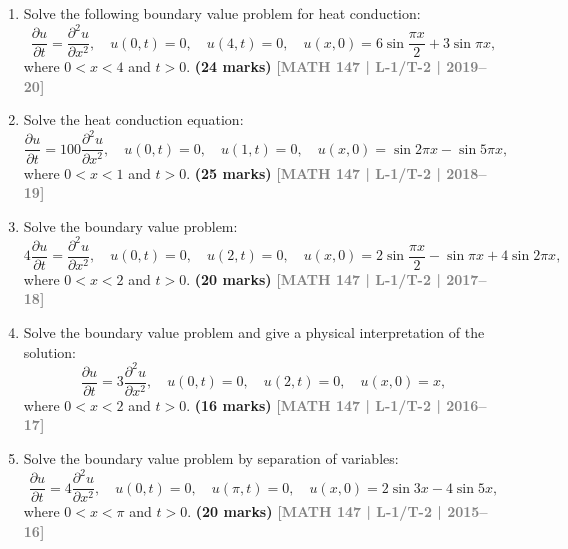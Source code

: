 \documentclass[12pt]{article}
\newcommand{\yr}[1]{\hfill\textcolor{gray}{\small\textbf{[#1]}}}
\newcommand{\mk}[1]{\textcolor{orange!70!black}{\small\textbf{(#1 marks)}}}
\begin{document}
\begin{enumerate}
\item Solve the following boundary value problem for heat conduction:
\[
\frac{\partial u}{\partial t}=\frac{\partial^{2}u}{\partial x^{2}},\quad u(0,t)=0,\quad u(4,t)=0,\quad u(x,0)=6\sin\frac{\pi x}{2}+3\sin\pi x,
\]
where $0<x<4$ and $t>0$.
\mk{24} \yr{MATH 147 | L-1/T-2 | 2019--20}



\item Solve the heat conduction equation:
\[
\frac{\partial u}{\partial t}=100\frac{\partial^{2}u}{\partial x^{2}},\quad u(0,t)=0,\quad u(1,t)=0,\quad u(x,0)=\sin 2\pi x-\sin 5\pi x,
\]
where $0<x<1$ and $t>0$.
\mk{25} \yr{MATH 147 | L-1/T-2 | 2018--19}



\item Solve the boundary value problem:
\[
4\frac{\partial u}{\partial t}=\frac{\partial^{2}u}{\partial x^{2}},\quad u(0,t)=0,\quad u(2,t)=0,\quad u(x,0)=2\sin\frac{\pi x}{2}-\sin\pi x+4\sin 2\pi x,
\]
where $0<x<2$ and $t>0$.
\mk{20} \yr{MATH 147 | L-1/T-2 | 2017--18}



\item Solve the boundary value problem and give a physical interpretation of the solution:
\[
\frac{\partial u}{\partial t}=3\frac{\partial^{2}u}{\partial x^{2}},\quad u(0,t)=0,\quad u(2,t)=0,\quad u(x,0)=x,
\]
where $0<x<2$ and $t>0$.
\mk{16} \yr{MATH 147 | L-1/T-2 | 2016--17}



\item Solve the boundary value problem by separation of variables:
\[
\frac{\partial u}{\partial t}=4\frac{\partial^{2}u}{\partial x^{2}},\quad u(0,t)=0,\quad u(\pi,t)=0,\quad u(x,0)=2\sin 3x-4\sin 5x,
\]
where $0<x<\pi$ and $t>0$.
\mk{20} \yr{MATH 147 | L-1/T-2 | 2015--16}



\end{enumerate}
\end{document}
